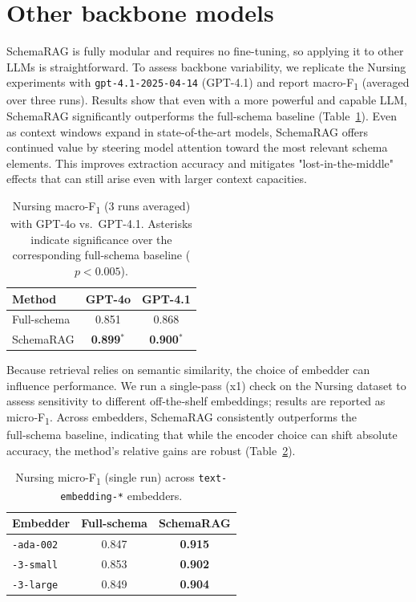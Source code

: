 \section{Other backbone models}
\label{sec:other_backbones}

SchemaRAG is fully modular and requires no fine-tuning, so applying it to other LLMs is straightforward. To assess backbone variability, we replicate the Nursing experiments with \texttt{gpt-4.1-2025-04-14} (GPT-4.1) and report macro-F\textsubscript{1} (averaged over three runs). Results show that even with a more powerful and capable LLM, SchemaRAG significantly outperforms the full-schema baseline (Table~\ref{tab:gpt41_macro}). Even as context windows expand in state-of-the-art models, SchemaRAG offers continued value by steering model attention toward the most relevant schema elements. This improves extraction accuracy and mitigates "lost-in-the-middle" effects that can still arise even with larger context capacities.


\begin{table}[ht]
\centering
\caption{Nursing macro-F\textsubscript{1} (3 runs averaged) with GPT-4o vs.\ GPT-4.1. Asterisks indicate significance over the corresponding full-schema baseline ($p<0.005$).}
\label{tab:gpt41_macro}
\begin{tabular}{lcc}
\toprule
\textbf{Method} & \textbf{GPT-4o} & \textbf{GPT-4.1} \\
\midrule
Full-schema   & 0.851 & 0.868 \\
SchemaRAG     & \textbf{0.899}$^{*}$ & \textbf{0.900}$^{*}$ \\
\bottomrule
\end{tabular}
\end{table}


Because retrieval relies on semantic similarity, the choice of embedder can influence performance. We run a single-pass (x1) check on the Nursing dataset to assess sensitivity to different off‑the‑shelf embeddings; results are reported as micro‑F\textsubscript{1}. Across embedders, SchemaRAG consistently outperforms the full‑schema baseline, indicating that while the encoder choice can shift absolute accuracy, the method’s relative gains are robust (Table~\ref{tab:embedder_swap_table}).

\begin{table}[t]
\centering
\caption{Nursing micro-F\textsubscript{1} (single run) across \texttt{text-embedding-*} embedders.}
\label{tab:embedder_swap_table}
\begin{tabular}{lcc}
\toprule
\textbf{Embedder} & \textbf{Full-schema} & \textbf{SchemaRAG} \\
\midrule
\texttt{-ada-002} & 0.847 & \textbf{0.915} \\
\texttt{-3-small}            & 0.853 & \textbf{0.902} \\
\texttt{-3-large}            & 0.849 & \textbf{0.904} \\
\bottomrule
\end{tabular}
\end{table}

